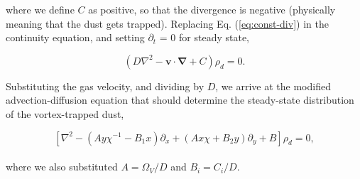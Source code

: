 \documentclass[apj]{emulateapj}
\renewcommand{\v}[1]{{\boldsymbol{#1}}} %
\newcommand{\del}{\v{\nabla}}
\newcommand{\Laplace}{\nabla^2}
\newcommand{\Eq}[1]{Eq. (\ref{#1})}
\newcommand{\eq}[1]{\Eq{#1}}
\newcommand{\beq}{\begin{equation}}
\newcommand{\eeq}{\end{equation}}
\begin{document}
\noindent where we define $C$ as positive, so that the divergence is negative (physically meaning that the dust gets trapped). Replacing \eq{eq:const-div} in the continuity equation, and setting $\partial_t$ =
0 for steady state, 

\beq
\left(D\Laplace{} -  \v{v}\cdot\del  + C\right)\rho_d = 0. 
\label{eq:steady}
\eeq

Substituting the gas velocity, and dividing by $D$, we
arrive at the modified advection-diffusion equation that should
determine the steady-state distribution of the vortex-trapped dust, 

\beq
\left[\Laplace{} - \left(Ay\chi^{-1} - B_1x\right) \partial_x  +
  \left(A x \chi + B_2y\right) \partial_y + B \right] \rho_d   = 0,  
\label{eq:dust-trapping-cartesian}
\eeq
\\
\noindent where we also substituted  $A=\varOmega_V/D$ and $B_i=C_i/D$.
\end{document}
